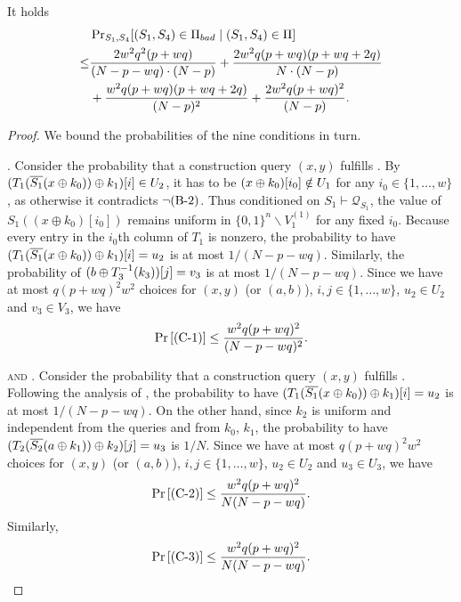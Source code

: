 \begin{lemma}
	\label{lemma:bad-outer-4-rounds}
	
	It holds
	\begin{align}
	& \operatorname{Pr}_{S_1,S_4}[(S_1,S_4) \in \emph{$\Pi_{bad}$}\mid (S_{1}, S_{4})\in\Pi]     \\
	\leq  &\frac{2 w^{2} q^{2} (p+w q)}{(N- p- wq) \cdot (N-p)} +\frac{2 w^{2} q (p+w q)(p+w q+2 q)}{N \cdot (N-p)}\\
	& + \frac{w^{2} q (p+w q)(p+w q+2 q)}{(N-p)^2} + \frac{2 w^{2} q (p+w q)^{2}}{(N-p)}.
	\label{eq:bound-bad-outer-4-rounds}
	\end{align}
\end{lemma}
\begin{proof}
We bound the probabilities of the nine conditions in turn.


\smallskip
\noindent \textsc{\cone}. Consider the probability that a construction query $(x,y)$ fulfills \cone. By $(T_1(\overline{S_1}(x\oplus k_0))\oplus k_1)[i]\in U_2$, it has to be $(x\oplus k_0)[i_0]\notin U_1$ for any $i_0\in\{1,\ldots,w\}$, as otherwise it contradicts $\neg\text{(B-2)}$. Thus conditioned on $S_{1} \vdash \mathcal{Q}_{S_{1}}$, the value of $S_1((x \oplus k_0)[i_0])$ remains uniform in $\{0, 1\}^{n} \backslash V_1^{(1)}$ for any fixed $i_0$. Because every entry in the $i_{0}$th column of $T_{1}$ is nonzero, the probability to have $(T_1(\overline{S_1}(x\oplus k_0))\oplus k_1)[i]=u_2$ is at most $1/(N-p-wq)$. Similarly, the probability of $(b\oplus T_{3}^{-1}(k_3))[j] = v_3$ is at most $1/(N-p-wq)$. Since we have at most $q(p+wq)^2w^2$ choices for $(x,y)$ (or $(a, b)$), $i, j \in\{1, \ldots, w\}$, $u_{2} \in U_{2}$ and $v_{3} \in V_{3}$, we have
%
%
$$
\operatorname{Pr}\left[\text{(C-1)}\right] \leq \frac{w^{2} q (p+w q)^{2}}{(N-p-wq)^{2}}.
$$



\smallskip
\noindent \textsc{\ctwo and \cthree}. Consider the probability that a construction query $(x,y)$ fulfills \ctwo. Following the analysis of \cone, the probability to have $(T_1(\overline{S_1}(x\oplus k_0))\oplus k_1)[i]=u_2$ is at most $1/(N-p-wq)$. On the other hand, since $k_{2}$ is uniform and independent from the queries and from $k_{0}$, $k_{1}$, the probability to have $(T_{2}(\overline{S_2}(a \oplus k_1))\oplus k_2)[j] = u_3$ is $1/N$. Since we have at most $q(p+wq)^2w^2$ choices for $(x,y)$ (or $(a, b)$), $i, j \in\{1, \ldots, w\}$, $u_{2} \in U_{2}$ and $u_{3} \in U_{3}$, we have
%
%
$$
\operatorname{Pr}\left[\text{(C-2)}\right] \leq \frac{w^{2} q (p+w q)^{2}}{N  (N-p-wq)}.
$$
%
Similarly,
%
$$
\operatorname{Pr}\left[\text{(C-3)}\right] \leq \frac{w^{2} q (p+w q)^{2}}{N  (N-p-wq)}.
$$





\end{proof}
